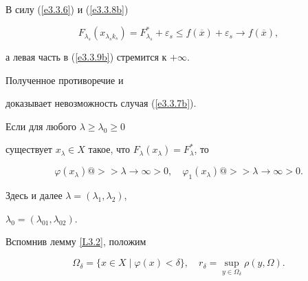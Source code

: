 \begin{pf}
\begin{equation}


\end{equation}


В силу (\ref{e3.3.6}) и (\ref{e3.3.8b})


$$F_{\lambda_s}(x_{\lambda_sk_s}) = F^{*}_{\lambda_s} +


\varepsilon_s\leq f(\overline{x}) + \varepsilon_s\longrightarrow


f(\overline{x}),$$


а левая часть в (\ref{e3.3.9b}) стремится к $+\infty$. 


Полученное противоречие и


доказывает невозможность случая (\ref{e3.3.7b}).


\end{pf}








\begin{cors}


Если для любого $\lambda \geq\lambda_0\geq 0$


существует $x_{\lambda}\in X$ такое, что $F_{\lambda}(x_{\lambda}) =


F^{*}_{\lambda}$, то


$$




\varphi(x_{\lambda})


@>>{\lambda\to \infty}>0,\quad


\varphi_1(x_{\lambda})


@>>{\lambda\to \infty}>0.




$$


Здесь и далее $\lambda=(\lambda_1, \lambda_2)$,


$\lambda_0=(\lambda_{01}, \lambda_{02})$.


\end{cors}





Вспомнив лемму \ref{L3.2}, положим


$$


\Omega_{\delta} = \{x\in X \mid \varphi(x) < \delta\}, \quad


r_{\delta} = \sup\limits_{y\in \Omega_{\delta}}\rho(y,\Omega).


$$






